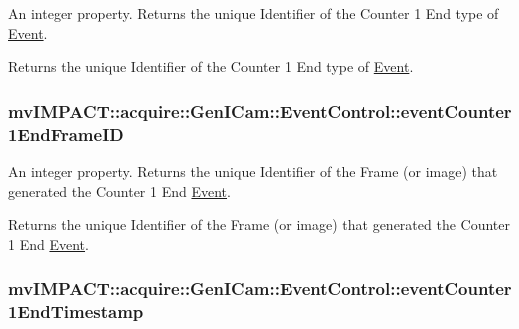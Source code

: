 An integer property. Returns the unique Identifier of the Counter 1 End type of \hyperlink{classmv_i_m_p_a_c_t_1_1acquire_1_1_event}{Event}. 

Returns the unique Identifier of the Counter 1 End type of \hyperlink{classmv_i_m_p_a_c_t_1_1acquire_1_1_event}{Event}. \hypertarget{classmv_i_m_p_a_c_t_1_1acquire_1_1_gen_i_cam_1_1_event_control_a5cfb22ee0b5251a0ec19b2f4ea025eea}{
\subsubsection[{event\+Counter1\+End\+Frame\+I\+D}]{ mv\+I\+M\+P\+A\+C\+T\+::acquire\+::\+Gen\+I\+Cam\+::\+Event\+Control\+::event\+Counter1\+End\+Frame\+I\+D}}\label{classmv_i_m_p_a_c_t_1_1acquire_1_1_gen_i_cam_1_1_event_control_a5cfb22ee0b5251a0ec19b2f4ea025eea}


An integer property. Returns the unique Identifier of the Frame (or image) that generated the Counter 1 End \hyperlink{classmv_i_m_p_a_c_t_1_1acquire_1_1_event}{Event}. 

Returns the unique Identifier of the Frame (or image) that generated the Counter 1 End \hyperlink{classmv_i_m_p_a_c_t_1_1acquire_1_1_event}{Event}. \hypertarget{classmv_i_m_p_a_c_t_1_1acquire_1_1_gen_i_cam_1_1_event_control_a9891545e43a59cdb3b1584bd09232123}{
\subsubsection[{event\+Counter1\+End\+Timestamp}]{ mv\+I\+M\+P\+A\+C\+T\+::acquire\+::\+Gen\+I\+Cam\+::\+Event\+Control\+::event\+Counter1\+End\+Timestamp}}\label{classmv_i_m_p_a_c_t_1_1acquire_1_1_gen_i_cam_1_1_event_control_a9891545e43a59cdb3b1584bd09232123}


